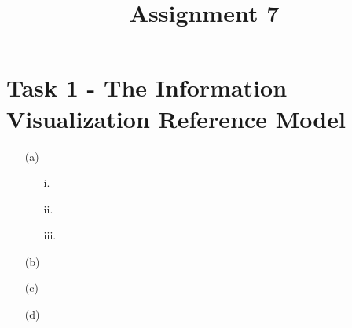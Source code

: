 \documentclass[a4paper]{article}
\date{}
\author{}
\title{\textbf{Assignment 7}}
\begin{document}
\maketitle 
\thispagestyle{fancy}

\section*{Task 1 - The Information Visualization Reference Model}
\begin{enumerate}
	\item[(a)]
		\begin{enumerate}
			\item[i.]
			\item[ii.]
			\item[iii.]
		\end{enumerate}
	\item[(b)]
	\item[(c)]
	\item[(d)]
\end{enumerate}

\clearpage
\end{document}
